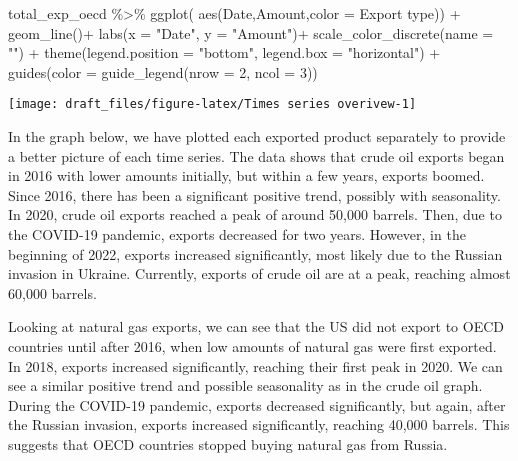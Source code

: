 \documentclass[
]{article}
\newenvironment{Shaded}{\begin{snugshade}}{\end{snugshade}}
\newcommand{\AttributeTok}[1]{\textcolor[rgb]{0.77,0.63,0.00}{#1}}
\newcommand{\DecValTok}[1]{\textcolor[rgb]{0.00,0.00,0.81}{#1}}
\newcommand{\FunctionTok}[1]{\textcolor[rgb]{0.00,0.00,0.00}{#1}}
\newcommand{\NormalTok}[1]{#1}
\newcommand{\SpecialCharTok}[1]{\textcolor[rgb]{0.00,0.00,0.00}{#1}}
\newcommand{\StringTok}[1]{\textcolor[rgb]{0.31,0.60,0.02}{#1}}
\begin{document}
\begin{Shaded}
\begin{Highlighting}[]
\NormalTok{total\_exp\_oecd }\SpecialCharTok{\%\textgreater{}\%} \FunctionTok{ggplot}\NormalTok{(}
 \FunctionTok{aes}\NormalTok{(Date,Amount,}\AttributeTok{color =} \StringTok{\textasciigrave{}}\AttributeTok{Export type}\StringTok{\textasciigrave{}}\NormalTok{)) }\SpecialCharTok{+}
   \FunctionTok{geom\_line}\NormalTok{()}\SpecialCharTok{+}
   \FunctionTok{labs}\NormalTok{(}\AttributeTok{x =} \StringTok{"Date"}\NormalTok{, }\AttributeTok{y =} \StringTok{"Amount"}\NormalTok{)}\SpecialCharTok{+}
    \FunctionTok{scale\_color\_discrete}\NormalTok{(}\AttributeTok{name =} \StringTok{""}\NormalTok{) }\SpecialCharTok{+}
  \FunctionTok{theme}\NormalTok{(}\AttributeTok{legend.position =} \StringTok{"bottom"}\NormalTok{, }\AttributeTok{legend.box =} \StringTok{"horizontal"}\NormalTok{) }\SpecialCharTok{+}
  \FunctionTok{guides}\NormalTok{(}\AttributeTok{color =} \FunctionTok{guide\_legend}\NormalTok{(}\AttributeTok{nrow =} \DecValTok{2}\NormalTok{, }\AttributeTok{ncol =} \DecValTok{3}\NormalTok{))}
\end{Highlighting}
\end{Shaded}

\begin{center}\texttt{[image: draft\_files/figure-latex/Times series overivew-1]} \end{center}

In the graph below, we have plotted each exported product separately to
provide a better picture of each time series. The data shows that crude
oil exports began in 2016 with lower amounts initially, but within a few
years, exports boomed. Since 2016, there has been a significant positive
trend, possibly with seasonality. In 2020, crude oil exports reached a
peak of around 50,000 barrels. Then, due to the COVID-19 pandemic,
exports decreased for two years. However, in the beginning of 2022,
exports increased significantly, most likely due to the Russian invasion
in Ukraine. Currently, exports of crude oil are at a peak, reaching
almost 60,000 barrels.

Looking at natural gas exports, we can see that the US did not export to
OECD countries until after 2016, when low amounts of natural gas were
first exported. In 2018, exports increased significantly, reaching their
first peak in 2020. We can see a similar positive trend and possible
seasonality as in the crude oil graph. During the COVID-19 pandemic,
exports decreased significantly, but again, after the Russian invasion,
exports increased significantly, reaching 40,000 barrels. This suggests
that OECD countries stopped buying natural gas from Russia.
\end{document}
